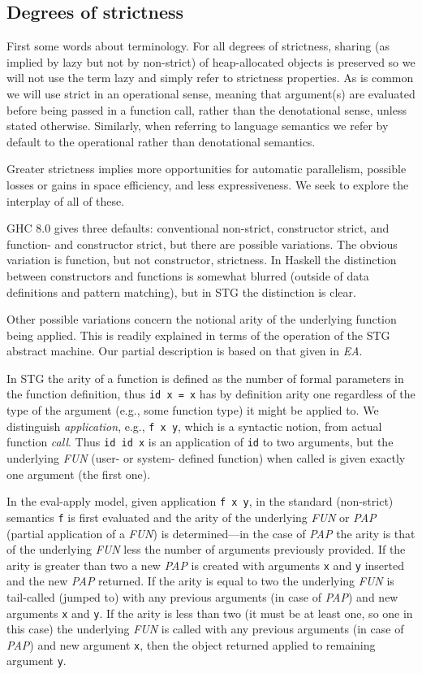 \documentclass{llncs}
\begin{document}
\subsection{Degrees of strictness}
First some words about terminology.  For all degrees of strictness, sharing
(as implied by lazy but not by non-strict) of heap-allocated objects is
preserved so we will not use the term lazy and simply refer to
strictness properties.  As is common we will use strict in an operational
sense, meaning that argument(s) are evaluated before being passed in a
function call, rather than the denotational sense, unless stated otherwise.
Similarly, when referring to language semantics we refer by default to the
operational rather than denotational semantics.

Greater strictness implies more opportunities for automatic parallelism,
possible losses or gains in space efficiency, and less expressiveness.  We
seek to explore the interplay of all of these.

GHC 8.0 gives three defaults: conventional non-strict, constructor strict, and
function- and constructor strict, but there are possible variations.  The
obvious variation is function, but not constructor, strictness.  In Haskell
the distinction between constructors and functions is somewhat blurred
(outside of data definitions and pattern matching), but in STG the distinction
is clear.

Other possible variations concern the notional arity of the underlying
function being applied.  This is readily explained in terms of the operation
of the STG abstract machine.  Our partial description is based on that given
in \emph{EA}.

In STG the arity of a function is defined as the number of formal parameters
in the function definition, thus \texttt{id x = x} has by definition arity one
regardless of the type of the argument (e.g., some function type) it might be
applied to.  We distinguish \emph{application}, e.g., \texttt{f x y}, which is
a syntactic notion, from actual function \emph{call}. Thus \texttt{id id x} is
an application of \texttt{id} to two arguments, but the underlying \emph{FUN}
(user- or system- defined function) when called is given exactly one
argument (the first one).

In the eval-apply model, given application \texttt{f x y}, in the standard
(non-strict) semantics \texttt{f} is first evaluated and the arity of the
underlying \emph{FUN} or \emph{PAP} (partial application of a \emph{FUN}) is
determined---in the case of \emph{PAP} the arity is that of the underlying
\emph{FUN} less the number of arguments previously provided.  If the arity is
greater than two a new \emph{PAP} is created with arguments \texttt{x} and
\texttt{y} inserted and the new \emph{PAP} returned.  If the arity is equal to
two the underlying \emph{FUN} is tail-called (jumped to) with any previous
arguments (in case of \emph{PAP}) and new arguments \texttt{x} and \texttt{y}.
If the arity is less than two (it must be at least one, so one in this case)
the underlying \emph{FUN} is called with any previous arguments (in case of
\emph{PAP}) and new argument \texttt{x}, then the object returned applied to
remaining argument \texttt{y}.
\end{document}
